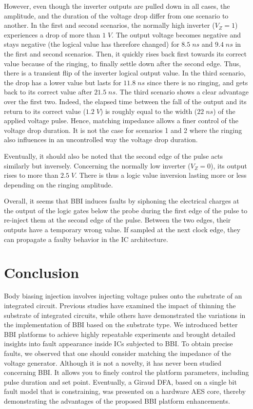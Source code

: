 \documentclass[10pt, conference, compsocconf]{IEEEtran}
\begin{document}
However, even though the inverter outputs are pulled down in all cases, the amplitude, and the duration of the voltage drop differ from one scenario to another.
In the first and second scenarios, the normally high inverter ($V_Z = 1$) experiences a drop of more than $1 \; V$.
The output voltage becomes negative and stays negative (the logical value has therefore changed) for $8.5 \; ns$ and $9.4 \; ns$ in the first and second scenarios.
Then, it quickly rises back first towards its correct value because of the ringing, to finally settle down after the second edge.
Thus, there is a transient flip of the inverter logical output value.
In the third scenario, the drop has a lower value but lasts for $11.8 \; ns$ since there is no ringing, and gets back to its correct value after $21.5 \; ns$.
The third scenario shows a clear advantage over the first two.
Indeed, the elapsed time between the fall of the output and its return to its correct value ($1.2 \; V$) is roughly equal to the width ($22 \; ns$) of the applied voltage pulse.
Hence, matching impedance allows a finer control of the voltage drop duration.
It is not the case for scenarios 1 and 2 where the ringing also influences in an uncontrolled way the voltage drop duration.

Eventually, it should also be noted that the second edge of the pulse acts similarly but inversely.
Concerning the normally low inverter ($V_Z = 0$), its output rises to more than $2.5 \; V$.
There is thus a logic value inversion lasting more or less depending on the ringing amplitude.

Overall, it seems that BBI induces faults by siphoning the electrical charges at the output of the logic gates below the probe during the first edge of the pulse to re-inject them at the second edge of the pulse.
Between the two edges, their outputs have a temporary wrong value.
If sampled at the next clock edge, they can propagate a faulty behavior in the IC architecture.

\section{Conclusion}
\label{conclusion}
Body biasing injection involves injecting voltage pulses onto the substrate of an integrated circuit.
Previous studies have examined the impact of thinning the substrate of integrated circuits, while others have demonstrated the variations in the implementation of BBI based on the substrate type.
We introduced better BBI platforms to achieve highly repeatable experiments and brought detailed insights into fault appearance inside ICs subjected to BBI.
To obtain precise faults, we observed that one should consider matching the impedance of the voltage generator.
Although it is not a novelty, it has never been studied concerning BBI.
It allows you to finely control the platform parameters, including pulse duration and set point.
Eventually, a Giraud DFA, based on a single bit fault model that is constraining, was presented on a hardware AES core, thereby demonstrating the advantages of the proposed BBI platform enhancements.


\end{document}

